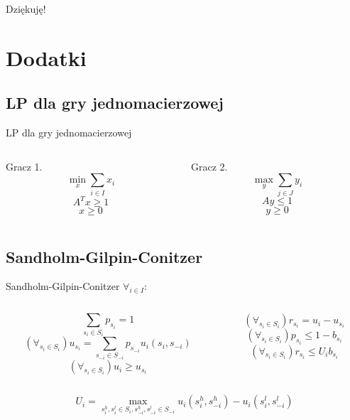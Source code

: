 \documentclass[xcolor=x11names,compress]{beamer}
\renewcommand{\(}{\begin{columns}}
\renewcommand{\)}{\end{columns}}
\newcommand{\<}[1]{\begin{column}{#1}}
\renewcommand{\>}{\end{column}}
\begin{document}

\begin{frame}
\begin{center}
{\LARGE Dziękuję!}
\end{center}
\end{frame}


\appendix
\section{Dodatki}

\subsection{LP dla gry jednomacierzowej}
\begin{frame}{LP dla gry jednomacierzowej}
\begin{columns}[c]
\begin{column}{.5\textwidth}
\begin{center}
Gracz 1.
$$\min_x \sum_{i \in I} x_i$$
$$A^Tx \geq 1$$
$$x \geq 0$$
\end{center}
\end{column}
\begin{column}{.5\textwidth}
\begin{center}
Gracz 2.
$$\max_y \sum_{j \in J} y_i$$
$$Ay \leq 1 $$
$$y \geq 0$$
\end{center}
\end{column}
\end{columns}
\end{frame}

\subsection{Sandholm-Gilpin-Conitzer}
\begin{frame}{Sandholm-Gilpin-Conitzer}
\LARGE $\forall_{i \in I}$:
\bigskip
\normalsize
\begin{columns}[c]
\begin{column}{.5\textwidth}
$$\sum_{{s_i} \in S_i} p_{s_i} = 1$$
$$(\forall_{s_i \in S_i}) u_{s_i} = \sum_{s_{-i} \in S_{-i}} p_{s_{-i}} u_i(s_i, s_{-i})$$
$$(\forall_{s_i \in S_i}) u_i \geq u_{s_i}$$
\end{column}
\begin{column}{.5\textwidth}
$$(\forall_{s_i \in S_i}) r_{s_i} = u_i - u_{s_i}$$
$$(\forall_{s_i \in S_i}) p_{s_i} \leq 1-b_{s_i}$$
$$(\forall_{s_i \in S_i}) r_{s_i} \leq U_i b_{s_i}$$
\end{column}
\end{columns}
\bigskip
$$U_i = \max_{s_i^h, s_i^l \in S_i, s_{-i}^h, s_{-i}^l \in S_{-i}} u_i(s_i^h, s_{-i}^h) - u_i(s_i^l, s_{-i}^l)$$
\end{frame}
\end{document}
